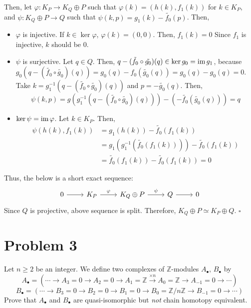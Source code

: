 \documentclass{article}
\newcommand{\qedsq}{\hfill$\square$}
\newcommand{\bbZ}{\mathbb{Z}}
\newcommand{\im}{\textnormal{im}\,}
\begin{document}
Then, let \(\varphi: K_P \to K_Q \oplus P\) such that \(\varphi(k) = (h(k), f_1(k))\) for \(k \in K_P\),
and \(\psi: K_Q \oplus P \to Q\) such that \(\psi(k, p) = g_1(k) - \tilde{f_0}(p)\).
Then,
\begin{itemize}
\item \(\varphi\) is injective. If \(k \in \ker\varphi\), \(\varphi(k) = (0, 0)\). Then, \(f_1(k) = 0\) Since \(f_1\) is injective, \(k\) should be \(0\).
\item \(\psi\) is surjective.
  Let \(q \in Q\).
  Then, \(q - (\tilde{f_0} \circ \tilde{g_0})(q) \in \ker g_0 = \im g_1\),
  because
  \(g_0(q - (\tilde{f_0} \circ \tilde{g_0})(q))
    = g_0(q) - f_0(\tilde{g_0}(q))
    = g_0(q) - g_0(q) = 0\).
  Take \(k = g_1^{-1}(q - (\tilde{f_0} \circ \tilde{g_0})(q))\)
  and \(p = -\tilde{g_0}(q)\).
  Then,
  \[\psi(k, p) =
    g(g_1^{-1}(q - (\tilde{f_0} \circ \tilde{g_0})(q))) - (- \tilde{f_0}(\tilde{g_0}(q))) = q\]
\item \(\ker \psi = \im \varphi\).
  Let \(k \in K_P\).
  Then,
  \begin{align*}
    \psi(h(k), f_1(k))
    &= g_1(h(k)) - \tilde{f_0}(f_1(k))
    \\&= g_1(g_1^{-1}(\tilde{f_0}(f_1(k)))) - \tilde{f_0}(f_1(k))
    \\&= \tilde{f_0}(f_1(k)) - \tilde{f_0}(f_1(k))
    = 0
  \end{align*}
\end{itemize}
Thus, the below is a short exact sequence:
\[\begin{tikzcd}
  0 \ar{r} &
  K_P \ar["\varphi"]{r} &
  K_Q \oplus P \ar["\psi"]{r} &
  Q \ar{r} &
  0
\end{tikzcd}\]
Since \(Q\) is projective, above sequence is split.
Therefore, \(K_Q \oplus P \simeq K_P \oplus Q\).
\qedsq

\newpage
\section*{Problem 3}

Let \(n \ge 2\) be an integer.
We define two complexes of \(\bbZ\)-modules \(A_\bullet\), \(B_\bullet\) by
\[A_\bullet = \left(
  \cdots
  \longrightarrow A_3 = 0
  \longrightarrow A_2 = 0
  \longrightarrow A_1 = \bbZ
  \xrightarrow{\times n} A_0 = \bbZ
  \longrightarrow A_{-1} = 0
  \longrightarrow \cdots
  \right)\]
\[B_\bullet = \left(
  \cdots
  \longrightarrow B_3 = 0
  \longrightarrow B_2 = 0
  \longrightarrow B_1 = 0
  \longrightarrow B_0 = \bbZ/n\bbZ
  \longrightarrow B_{-1} = 0
  \longrightarrow \cdots
  \right)\]
Prove that \(A_\bullet\) and \(B_\bullet\) are quasi-isomorphic but \emph{not} chain homotopy equivalent.
\end{document}
